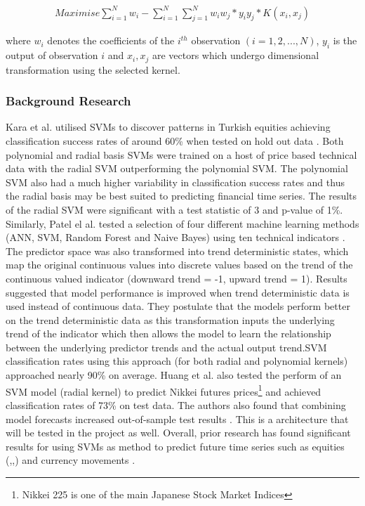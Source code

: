 \documentclass[11pt, a4paper]{article}
\begin{document}
\begin{align}
Maximise  \sum^{N}_{i = 1}w_{i} - \sum^{N}_{i = 1} \sum^{N}_{j = 1}w_{i}w_{j}*y_{i}y_{j}*K(x_{i},x_{j}) 
\end{align}

where $w_{i}$ denotes the coefficients of the $i^{th}$ observation $(i = 1,2,...,N)$, $y_{i}$ is the output of observation $i$ and $x_{i}, x_{j}$ are vectors which undergo dimensional transformation using the selected kernel.
\subsubsection{Background Research}
 Kara et al. utilised SVMs to discover patterns in Turkish equities achieving classification success rates of around 60\% when tested on hold out data \cite{Kara2011}. Both polynomial and radial basis SVMs were trained on a host of price based technical data with the radial SVM outperforming the polynomial SVM. The polynomial SVM also had a much higher variability in classification success rates and thus the radial basis may be best suited to predicting financial time series. The results of the radial SVM were significant with a test statistic of 3 and p-value of 1\%. 
\newline Similarly, Patel el al. tested a selection of four different machine learning methods (ANN, SVM, Random Forest and Naive Bayes) using ten technical indicators \cite{Patel2015}. The predictor space was also transformed into trend deterministic states, which map the original continuous values into discrete values based on the trend of the continuous valued indicator (downward trend = -1, upward trend = 1). Results suggested that model performance is improved when trend deterministic data is used instead of continuous data. They postulate that the models perform better on the trend deterministic data as this transformation inputs the underlying trend of the indicator which then allows the model to learn the relationship between the underlying predictor trends and the actual output trend.\newline SVM classification rates using this approach (for both radial and polynomial kernels) approached nearly 90\% on average.
Huang et al. also tested the perform of an SVM model (radial kernel) to predict Nikkei futures prices\footnote{Nikkei 225 is one of the main Japanese Stock Market Indices} and achieved classification rates of 73\% on test data. The authors also found that combining model forecasts increased out-of-sample test results \cite{Huang2005}. This is a architecture that will be tested in the project as well.
Overall, prior research has found significant results for using SVMs as method to predict future time series such as equities (\cite{Gui2015},\cite{Shen2012},\cite{Kim2003}) and currency movements \cite{Kamruzzaman2004}.
\end{document}
